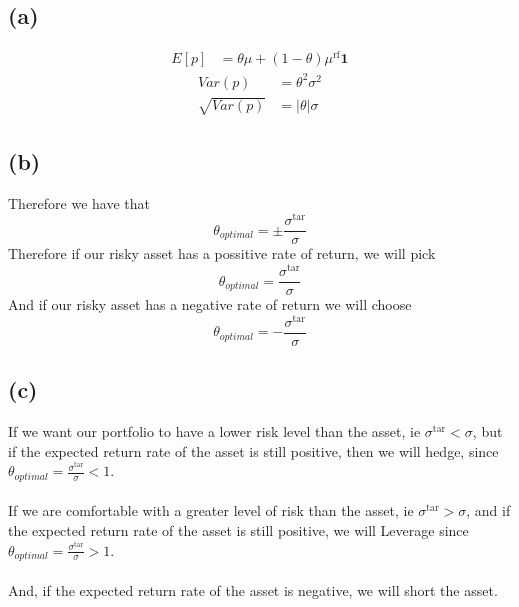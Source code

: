 \subsection*{(a)}
\begin{align*}
	E[p]&=\boxed{\theta\mu+(1-\theta)\mu^{\text{rf}}\textbf{1}}
\end{align*}
\begin{align*}
	Var(p)&=\theta^2\sigma^2\\
	\sqrt{Var(p)}&=\boxed{|\theta|\sigma}
\end{align*}
\subsection*{(b)}
Therefore we have that 
$$\theta_{optimal}=\pm \frac{\sigma^{\text{tar}}}{\sigma}$$
Therefore if our risky asset has a possitive rate of return, we will pick
$$\theta_{optimal}=\boxed{\frac{\sigma^{\text{tar}}}{\sigma}}$$
And if our risky asset has a negative rate of return we will choose
$$\theta_{optimal}=\boxed{-\frac{\sigma^{\text{tar}}}{\sigma}}$$
\subsection*{(c)}
If we want our portfolio to have a lower risk level than the asset, ie $\sigma^{\text{tar}}<\sigma$,
but if the expected return rate of the asset is still positive, then we will hedge,
since $\theta_{optimal}=\frac{\sigma^{\text{tar}}}{\sigma}<1$.\\\\
If we are comfortable with a greater level of risk than the asset, ie $\sigma^{\text{tar}}>\sigma$, and
if the expected return rate of the asset is still positive, we will Leverage
since $\theta_{optimal}=\frac{\sigma^{\text{tar}}}{\sigma}>1$.\\\\
And, if the expected return rate of the asset is negative, we will short the asset.

